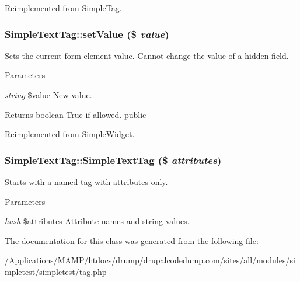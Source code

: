 Reimplemented from \hyperlink{class_simple_tag_a158fcbf8b82e7a6f7b6855c1dbe0715b}{SimpleTag}.\hypertarget{class_simple_text_tag_a255675d0e1f881000de30be56723db31}{
\subsubsection[{setValue}]{\setlength{\rightskip}{0pt plus 5cm}SimpleTextTag::setValue (\$ {\em value})}}
\label{class_simple_text_tag_a255675d0e1f881000de30be56723db31}
Sets the current form element value. Cannot change the value of a hidden field. 
\begin{DoxyParams}{Parameters}
\item[{\em string}]\$value New value. \end{DoxyParams}
\begin{DoxyReturn}{Returns}
boolean True if allowed.  public 
\end{DoxyReturn}


Reimplemented from \hyperlink{class_simple_widget_a9e048a450e2d29a601e672deda9fa869}{SimpleWidget}.\hypertarget{class_simple_text_tag_aae6625ae2b202a046e32ab1dfae717d6}{
\subsubsection[{SimpleTextTag}]{\setlength{\rightskip}{0pt plus 5cm}SimpleTextTag::SimpleTextTag (\$ {\em attributes})}}
\label{class_simple_text_tag_aae6625ae2b202a046e32ab1dfae717d6}
Starts with a named tag with attributes only. 
\begin{DoxyParams}{Parameters}
\item[{\em hash}]\$attributes Attribute names and string values. \end{DoxyParams}


The documentation for this class was generated from the following file:\begin{DoxyCompactItemize}
\item 
/Applications/MAMP/htdocs/drump/drupalcodedump.com/sites/all/modules/simpletest/simpletest/tag.php\end{DoxyCompactItemize}
